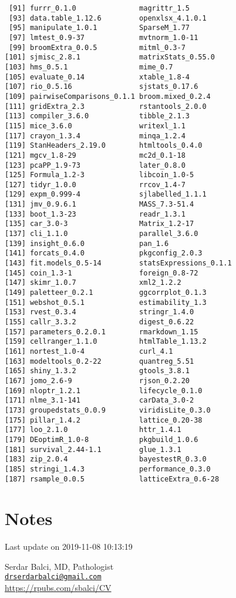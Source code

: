 \documentclass[]{article}
\begin{document}
\begin{verbatim}
 [91] furrr_0.1.0               magrittr_1.5             
 [93] data.table_1.12.6         openxlsx_4.1.0.1         
 [95] manipulate_1.0.1          SparseM_1.77             
 [97] lmtest_0.9-37             mvtnorm_1.0-11           
 [99] broomExtra_0.0.5          mitml_0.3-7              
[101] sjmisc_2.8.1              matrixStats_0.55.0       
[103] hms_0.5.1                 mime_0.7                 
[105] evaluate_0.14             xtable_1.8-4             
[107] rio_0.5.16                sjstats_0.17.6           
[109] pairwiseComparisons_0.1.1 broom.mixed_0.2.4        
[111] gridExtra_2.3             rstantools_2.0.0         
[113] compiler_3.6.0            tibble_2.1.3             
[115] mice_3.6.0                writexl_1.1              
[117] crayon_1.3.4              minqa_1.2.4              
[119] StanHeaders_2.19.0        htmltools_0.4.0          
[121] mgcv_1.8-29               mc2d_0.1-18              
[123] pcaPP_1.9-73              later_0.8.0              
[125] Formula_1.2-3             libcoin_1.0-5            
[127] tidyr_1.0.0               rrcov_1.4-7              
[129] expm_0.999-4              sjlabelled_1.1.1         
[131] jmv_0.9.6.1               MASS_7.3-51.4            
[133] boot_1.3-23               readr_1.3.1              
[135] car_3.0-3                 Matrix_1.2-17            
[137] cli_1.1.0                 parallel_3.6.0           
[139] insight_0.6.0             pan_1.6                  
[141] forcats_0.4.0             pkgconfig_2.0.3          
[143] fit.models_0.5-14         statsExpressions_0.1.1   
[145] coin_1.3-1                foreign_0.8-72           
[147] skimr_1.0.7               xml2_1.2.2               
[149] paletteer_0.2.1           ggcorrplot_0.1.3         
[151] webshot_0.5.1             estimability_1.3         
[153] rvest_0.3.4               stringr_1.4.0            
[155] callr_3.3.2               digest_0.6.22            
[157] parameters_0.2.0.1        rmarkdown_1.15           
[159] cellranger_1.1.0          htmlTable_1.13.2         
[161] nortest_1.0-4             curl_4.1                 
[163] modeltools_0.2-22         quantreg_5.51            
[165] shiny_1.3.2               gtools_3.8.1             
[167] jomo_2.6-9                rjson_0.2.20             
[169] nloptr_1.2.1              lifecycle_0.1.0          
[171] nlme_3.1-141              carData_3.0-2            
[173] groupedstats_0.0.9        viridisLite_0.3.0        
[175] pillar_1.4.2              lattice_0.20-38          
[177] loo_2.1.0                 httr_1.4.1               
[179] DEoptimR_1.0-8            pkgbuild_1.0.6           
[181] survival_2.44-1.1         glue_1.3.1               
[183] zip_2.0.4                 bayestestR_0.3.0         
[185] stringi_1.4.3             performance_0.3.0        
[187] rsample_0.0.5             latticeExtra_0.6-28      
\end{verbatim}

\pagebreak

\hypertarget{notes}{%
\section{Notes}\label{notes}}

Last update on 2019-11-08 10:13:19

Serdar Balci, MD, Pathologist\\
\href{mailto:drserdarbalci@gmail.com}{\nolinkurl{drserdarbalci@gmail.com}}\\
\url{https://rpubs.com/sbalci/CV}

\pagebreak

\newpage
\end{document}
